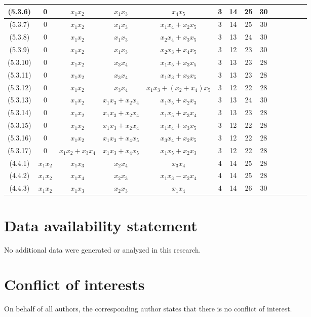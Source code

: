 \documentclass[10pt,reqno]{amsart}
\theoremstyle{definition}
\begin{document}
\begin{table}[h!]
{\begin{tabu}{|c|c|c|c|c|c|c|c|c|c|c|c|c|c|}
\hline
(5.3.6) & 0 & $x_1x_2$ & $x_1x_3$ & $x_4x_5$ & 3 & 14 & 25 & 30\\
\hline
(5.3.7) & 0 & $x_1x_2$ & $x_1x_3$ & $x_1x_4+x_2x_5$ & 3 & 14 & 25 & 30\\
\hline
(5.3.8) & 0 & $x_1x_2$ & $x_1x_3$ & $x_2x_4+x_3x_5$ & 3 & 13 & 24 & 30\\
\hline
(5.3.9) & 0 & $x_1x_2$ & $x_1x_3$ & $x_2x_3+x_4x_5$ & 3 & 12 & 23 & 30\\
\hline
(5.3.10) & 0 & $x_1x_2$ & $x_3x_4$ & $x_1x_5+x_3x_5$ & 3 & 13 & 23 & 28\\
\hline
(5.3.11) & 0 & $x_1x_2$ & $x_3x_4$ & $x_1x_3+x_2x_5$ & 3 & 13 & 23 & 28\\
\hline
(5.3.12) & 0 & $x_1x_2$ & $x_3x_4$ & $x_1x_3+(x_2+x_4)x_5$ & 3 & 12 & 22 & 28\\
\hline
(5.3.13) & 0 & $x_1x_2$ & $x_1x_3+x_2x_4$ & $x_1x_5+x_2x_3$ & 3 & 13 & 24 & 30\\
\hline
(5.3.14) & 0 & $x_1x_2$ & $x_1x_3+x_2x_4$ & $x_1x_5+x_3x_4$ & 3 & 13 & 23 & 28\\
\hline
(5.3.15) & 0 & $x_1x_2$ & $x_1x_3+x_2x_4$ & $x_1x_4+x_3x_5$ & 3 & 12 & 22 & 28\\
\hline
(5.3.16) & 0 & $x_1x_2$ & $x_1x_3+x_4x_5$ & $x_3x_4+x_2x_5$ & 3 & 12 & 22 & 28\\
\hline
(5.3.17) & 0 & $x_1x_2+x_3x_4$ & $x_1x_3+x_4x_5$ & $x_1x_5+x_2x_3$ & 3 & 12 & 22 & 28\\
\hline
(4.4.1) & $x_1x_2$ & $x_1x_3$ & $x_2x_4$ & $x_3x_4$ & 4 & 14 & 25 & 28\\
\hline
(4.4.2) & $x_1x_2$ & $x_1x_4$ & $x_2x_3$ & $x_1x_3-x_2x_4$ & 4 & 14 & 25 & 28\\
\hline
(4.4.3) & $x_1x_2$ & $x_1x_3$ & $x_2x_3$ & $x_1x_4$ & 4 & 14 & 26 & 30\\
\hline
\end{tabu}}
\end{table}

\section*{Data availability statement}
No additional data were generated or analyzed in this research.

\section*{Conflict of interests}
On behalf of all authors, the corresponding author states that there is no conflict of interest.
\end{document}

